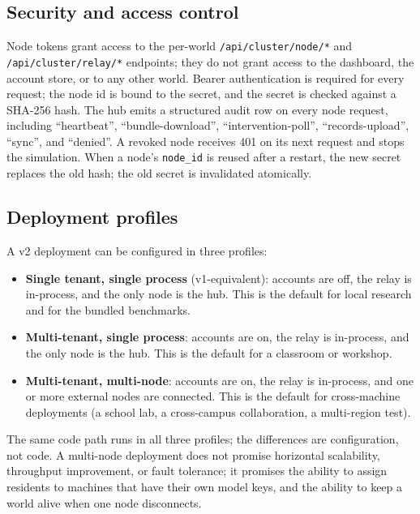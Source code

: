 \subsection{Security and access control}

Node tokens grant access to the per-world \texttt{/api/cluster/node/*}
and \texttt{/api/cluster/relay/*} endpoints; they do not grant access
to the dashboard, the account store, or to any other world.  Bearer
authentication is required for every request; the node id is bound to
the secret, and the secret is checked against a SHA-256 hash.  The hub
emits a structured audit row on every node request, including
``heartbeat'', ``bundle-download'', ``intervention-poll'',
``records-upload'', ``sync'', and ``denied''.  A revoked node receives
401 on its next request and stops the simulation.  When a node's
\texttt{node\_id} is reused after a restart, the new secret replaces
the old hash; the old secret is invalidated atomically.

\subsection{Deployment profiles}

A v2 deployment can be configured in three profiles:

\begin{itemize}[leftmargin=*]
  \item \textbf{Single tenant, single process} (v1-equivalent): accounts
  are off, the relay is in-process, and the only node is the hub.  This
  is the default for local research and for the bundled benchmarks.
  \item \textbf{Multi-tenant, single process}: accounts are on, the
  relay is in-process, and the only node is the hub.  This is the
  default for a classroom or workshop.
  \item \textbf{Multi-tenant, multi-node}: accounts are on, the relay
  is in-process, and one or more external nodes are connected.  This
  is the default for cross-machine deployments (a school lab, a
  cross-campus collaboration, a multi-region test).
\end{itemize}

The same code path runs in all three profiles; the differences are
configuration, not code.  A multi-node deployment does not promise
horizontal scalability, throughput improvement, or fault tolerance; it
promises the ability to assign residents to machines that have their
own model keys, and the ability to keep a world alive when one node
disconnects.

